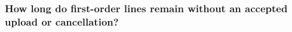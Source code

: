 \subsubsection{How long do first-order lines remain without an accepted upload or cancellation?}


\clearpage
\linenumbers



\clearpage



